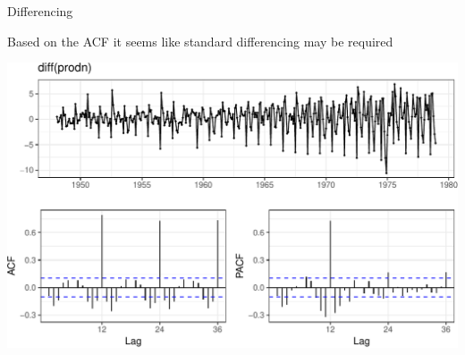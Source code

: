 \documentclass[11pt,ignorenonframetext,]{beamer}
\begin{document}
\begin{frame}{%
\protect\hypertarget{differencing-1}{%
Differencing}}

Based on the ACF it seems like standard differencing may be required

\begin{center}\includegraphics[width=\textwidth]{Lec11_files/figure-beamer/unnamed-chunk-16-1} \end{center}

\end{frame}
\end{document}
